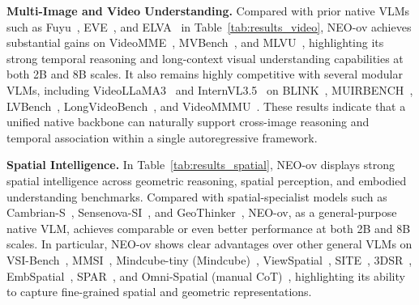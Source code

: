 \documentclass[11pt]{article}
\begin{document}
\textbf{Multi-Image and Video Understanding.}
Compared with prior native VLMs such as Fuyu~\cite{VLM:Fuyu-8b}, EVE~\cite{VLM:EVE}, and ELVA~\cite{VLM:ELVA} in Table~\ref{tab:results_video}, NEO-ov achieves substantial gains on VideoMME~\cite{fu2025videomme}, MVBench~\cite{li2024mvbench}, and MLVU~\cite{zhou2025mlvu}, highlighting its strong temporal reasoning and long-context visual understanding capabilities at both 2B and 8B scales.
It also remains highly competitive with several modular VLMs, including VideoLLaMA3~\cite{VLM:VideoLLaMA3} and InternVL3.5~\cite{VLM:InternVL-3.5} on BLINK~\cite{fu2024blink}, MUIRBENCH~\cite{wang2025muirbench}, LVBench~\cite{wang2025lvbench}, LongVideoBench~\cite{wu2024longvideobench}, and VideoMMMU~\cite{hu2025videommmu}. These results indicate that a unified native backbone can naturally support cross-image reasoning and temporal association within a single autoregressive framework.

\textbf{Spatial Intelligence.}
In Table~\ref{tab:results_spatial}, NEO-ov displays strong spatial intelligence across geometric reasoning, spatial perception, and embodied understanding benchmarks. Compared with spatial-specialist models such as Cambrian-S~\cite{yang2025cambrian-s}, Sensenova-SI~\cite{cai2025sensenova-si}, and GeoThinker~\cite{li2026geothinker}, NEO-ov, as a general-purpose native VLM, achieves comparable or even better performance at both 2B and 8B scales. In particular, NEO-ov shows clear advantages over other general VLMs on VSI-Bench~\cite{yang2025vsi-bench}, MMSI~\cite{yang2025mmsi}, Mindcube-tiny (Mindcube)~\cite{wang2025mindcube}, ViewSpatial~\cite{li2025viewspatial}, SITE~\cite{wang2025site}, 3DSR~\cite{ma20253dsrbench}, EmbSpatial~\cite{du2024embspatial}, SPAR~\cite{zhang2026spar}, and Omni-Spatial (manual CoT)~\cite{jia2025omnispatial}, highlighting its ability to capture fine-grained spatial and geometric representations.


\end{document}
